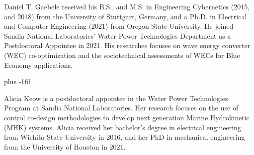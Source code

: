 \documentclass[lettersize,journal]{IEEEtran}
\begin{document}
\begin{IEEEbiography}{Daniel T. Gaebele}
received his B.S., and M.S. in Engineering Cybernetics (2015, and 2018) from the University of Stuttgart, Germany, and a Ph.D. in Electrical and Computer Engineering (2021) from Oregon State University.
He joined Sandia National Laboratories' Water Power Technologies Department as a Postdoctoral Appointee in 2021.
His researches focuses on wave energy converter (WEC) co-optimization and the sociotechnical assessments of WECs for Blue Economy applications.
\end{IEEEbiography}

\vskip 0pt plus -1fil

\begin{IEEEbiography}{Alicia Keow}
is a postdoctoral appointee in the Water Power Technologies Program at Sandia National Laboratories.
Her research focuses on the use of control co-design methodologies to develop next generation Marine Hydrokinetic (MHK) systems.
Alicia received her bachelor's degree in electrical engineering from Wichita State University in 2016, and her PhD in mechanical engineering from the University of Houston in 2021.
\end{IEEEbiography}
\end{document}
